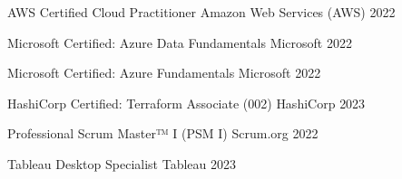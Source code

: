 

\begin{cvhonors}

  \cvhonor
    {AWS Certified Cloud Practitioner} %
    {Amazon Web Services (AWS)} %
    {} %
    {2022} %

  \cvhonor
    {Microsoft Certified: Azure Data Fundamentals} %
    {Microsoft} %
    {} %
    {2022} %

  \cvhonor
    {Microsoft Certified: Azure Fundamentals} %
    {Microsoft} %
    {} %
    {2022} %

  \cvhonor
    {HashiCorp Certified: Terraform Associate (002)} %
    {HashiCorp} %
    {} %
    {2023} %

  \cvhonor
    {Professional Scrum Master™ I (PSM I)} %
    {Scrum.org} %
    {} %
    {2022} %

  \cvhonor
    {Tableau Desktop Specialist} %
    {Tableau} %
    {} %
    {2023} %

\end{cvhonors}
